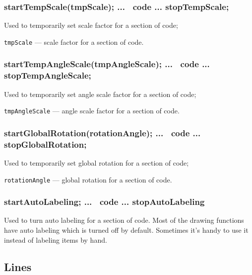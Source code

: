 \documentclass{ltxdoc}
\begin{document}

	

\subsubsection{startTempScale(tmpScale); ... \METAPOST\ code ... stopTempScale;}\label{startTempScale}

	Used to temporarily set scale factor for a section of code;

	\texttt{tmpScale} — scale factor for a section of code.
		
\subsubsection{startTempAngleScale(tmpAngleScale); ... \METAPOST\ code ... stopTempAngleScale;}\label{startTempAngleScale}

	Used to temporarily set angle scale factor for a section of code;

	\texttt{tmpAngleScale} — angle scale factor for a section of code.

\subsubsection{startGlobalRotation(rotationAngle); ... \METAPOST\ code ... stopGlobalRotation;}\label{startGlobalRotation}

	Used to temporarily set global rotation for a section of code;

	\texttt{rotationAngle} — global rotation for a section of code.
	
\subsubsection{startAutoLabeling; ... \METAPOST\ code ... stopAutoLabeling}\label{startAutoLabeling}

	Used to turn auto labeling for a section of code. Most of the drawing functions have auto labeling which is turned off by default. Sometimes it's handy to use it instead of labeling items by hand.



\subsection{Lines}
\end{document}
